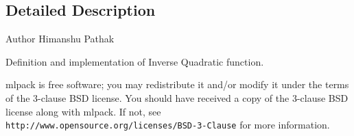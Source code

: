 \subsection{Detailed Description}
\begin{DoxyAuthor}{Author}
Himanshu Pathak
\end{DoxyAuthor}
Definition and implementation of Inverse Quadratic function.

mlpack is free software; you may redistribute it and/or modify it under the terms of the 3-\/clause B\+SD license. You should have received a copy of the 3-\/clause B\+SD license along with mlpack. If not, see {\tt http\+://www.\+opensource.\+org/licenses/\+B\+S\+D-\/3-\/\+Clause} for more information. 